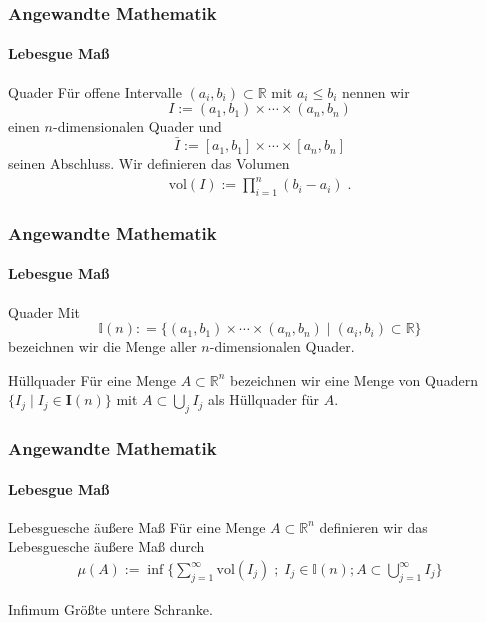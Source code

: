 \documentclass{beamer}
\begin{document}
\begin{frame}
    \frametitle{Angewandte Mathematik}
\framesubtitle{Lebesgue Maß}
    \begin{block}{Quader}
Für offene Intervalle $(a_i,b_i) \subset \mathbb{R}$ mit $a_i \leq b_i$ nennen wir 
$$I := (a_1,b_1) \times \cdots \times (a_n,b_n)$$ 
einen $n$-dimensionalen Quader und 
$$\bar{I}:= [a_1, b_1] \times \cdots \times [a_n,b_n]$$
 seinen Abschluss. Wir definieren das Volumen 
\begin{align*}
\text{vol} (I):=   \prod_{i = 1}^n (b_i -a_i)  \; .
\end{align*}

\end{block}
 \end{frame}



\begin{frame}
    \frametitle{Angewandte Mathematik}
\framesubtitle{Lebesgue Maß}
    \begin{block}{Quader}
Mit $$\mathbb{I}(n): = \{   (a_1,b_1) \times \cdots \times (a_n,b_n) \; | \;  (a_i, b_i) \subset \mathbb{R} \}$$ bezeichnen wir die Menge aller $n$-dimensionalen Quader. 
\end{block}
    \begin{block}{Hüllquader}
Für eine Menge $A \subset \mathbb{R}^n$ bezeichnen wir eine Menge von Quadern $\{ I_j \; | \;  I_j \in \mathbf{I}(n)  \}$ mit $A \subset \bigcup_j I_j$ als Hüllquader für $A$.
\end{block}
 \end{frame}


\begin{frame}
    \frametitle{Angewandte Mathematik}
\framesubtitle{Lebesgue Maß}
    \begin{block}{ Lebesguesche äußere Maß}
Für eine Menge $A \subset \mathbb{R}^n$ definieren wir das Lebesguesche äußere Maß durch 
\begin{align*}
\mu (A):=   \inf \biggl \{ \sum_{j=1}^{\infty}   \text{vol} (I_j)\; ; \; I_j \in \mathbb{I}(n); A \subset \bigcup_{j= 1}^{\infty} I_j \biggr \} 
\end{align*}
\end{block}
    \begin{block}{Infimum}
Größte untere Schranke.
\end{block}
 \end{frame}
\end{document}

